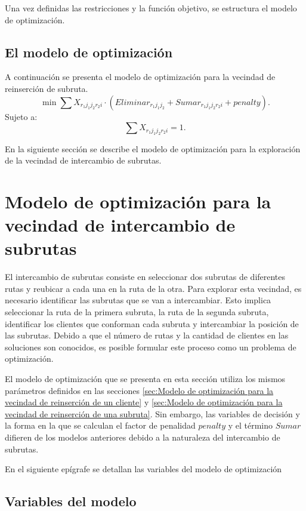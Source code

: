 \documentclass[12pt]{report}
\begin{document}
	Una vez definidas las restricciones y la función objetivo, se estructura el modelo de optimización.

	\subsection{El modelo de optimización}
	\label{sec:El Modelo}


	A continuación se presenta el modelo de optimización para la vecindad de reinserción de subruta.
	\[
	\min \sum X_{r_1j_1j_2r_2i} \cdot (Eliminar_{r_1j_1j_2} + Sumar_{r_1j_1j_2r_2i} + penalty).
	\]
	Sujeto a:
	\[
	\sum  X_{r_1j_1j_2r_2i} = 1.
      \]

	En la siguiente sección se describe el modelo de optimización para la exploración de la vecindad de intercambio de subrutas.

	\section{Modelo de optimización para la vecindad de intercambio de subrutas}
	\label{sec:Modelo de optimización para la vecindad de intercambio de subrutas}

	El intercambio de subrutas consiste en seleccionar dos subrutas de diferentes rutas y reubicar a cada una en la ruta de la otra. Para explorar esta vecindad, es necesario identificar las subrutas que se van a intercambiar. Esto implica seleccionar la ruta de la primera subruta, la ruta de la segunda subruta, identificar los clientes que conforman cada subruta y intercambiar la posición de las subrutas. Debido a que el número de rutas y la cantidad de clientes en las soluciones son conocidos, es posible formular este proceso como un problema de optimización.

	El modelo de optimización que se presenta en esta sección utiliza los mismos parámetros definidos en las secciones \ref{sec:Modelo de optimización para la vecindad de reinserción de un cliente} y \ref{sec:Modelo de optimización para la vecindad de reinserción de una subruta}. Sin embargo, las variables de decisión y la forma en la que se calculan el factor de penalidad $penalty$ y el término $Sumar$ difieren de los modelos anteriores debido a la naturaleza del intercambio de subrutas.


	En el siguiente epígrafe se detallan las variables del modelo de optimización
	\subsection{Variables del modelo}
\end{document}
